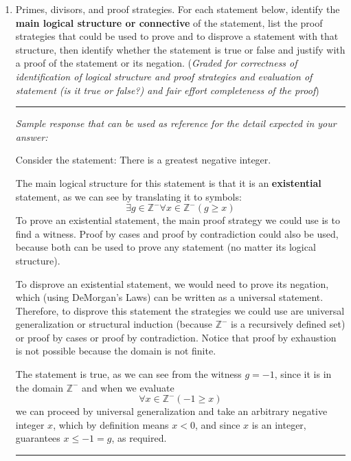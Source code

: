 \begin{enumerate}[labelindent=0pt, leftmargin=0pt]
    \item Primes, divisors, and proof strategies. For each statement below, identify the {\bf main logical structure or connective} of the 
    statement, list the proof strategies that could be used to prove and to disprove a statement with that structure, 
    then identify whether the statement is true or false and justify with a proof of the statement or its negation. 
    ({\it Graded for correctness of identification of logical structure and proof strategies and evaluation of statement (is it true or false?) 
    and fair effort completeness of the proof}) 


    \rule{0.5\textwidth}{.4pt}
    
    {\it Sample response that can be used as reference for the detail expected 
    in your answer:} 

    Consider the statement: There is a greatest negative integer.

    The main logical structure for this statement is that it is an {\bf existential} statement, as we can 
    see by translating it to symbols: 
    \[
        \exists g \in \mathbb{Z}^{-} \forall x \in \mathbb{Z}^{-} ( g \geq x)
    \]
    To prove an existential statement, the main proof strategy we could use is to find a witness. 
    Proof by cases and proof by contradiction could also be used, because 
    both can be used to prove any statement (no matter its logical structure).

    To disprove an existential statement, we would need to prove its negation, which (using DeMorgan's Laws) can be 
    written as a universal statement. Therefore, to disprove this statement the strategies we could use are 
    universal generalization or structural induction (because $\mathbb{Z}^{-}$ is a recursively defined set) or 
    proof by cases or proof by contradiction. Notice that proof by exhaustion is not possible because the domain is not finite.

    The statement is true, as we can see from the witness $g = -1$, since it is in the domain $\mathbb{Z}^{-}$ and when we evaluate
    \[
        \forall x \in \mathbb{Z}^{-} ( -1 \geq x)
    \]
    we can proceed by universal generalization and take an arbitrary negative integer $x$, which by definition means $x < 0$, 
    and since $x$ is an integer, guarantees $x \leq -1 = g$, as required.
    \rule{0.5\textwidth}{.4pt}


\end{enumerate}
